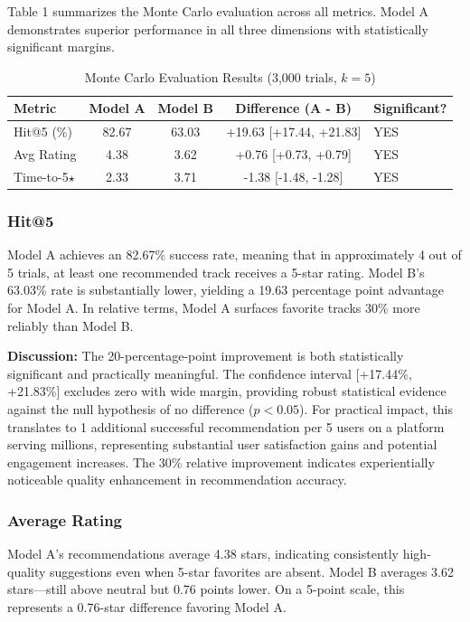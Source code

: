 \documentclass[12pt,a4paper]{article}
\begin{document}
Table 1 summarizes the Monte Carlo evaluation across all metrics. Model A demonstrates superior performance in all three dimensions with statistically significant margins.

\begin{table}[H]
\centering
\caption{Monte Carlo Evaluation Results (3,000 trials, $k=5$)}
\label{tab:mc_results}
\begin{tabular}{lcccl}
\toprule
\textbf{Metric} & \textbf{Model A} & \textbf{Model B} & \textbf{Difference (A - B)} & \textbf{Significant?} \\
\midrule
Hit@5 (\%) & 82.67 & 63.03 & +19.63 [+17.44, +21.83] & YES \\
Avg Rating & 4.38 & 3.62 & +0.76 [+0.73, +0.79] & YES \\
Time-to-5$\star$ & 2.33 & 3.71 & -1.38 [-1.48, -1.28] & YES \\
\bottomrule
\end{tabular}
\end{table}

\subsubsection{Hit@5}

Model A achieves an 82.67\% success rate, meaning that in approximately 4 out of 5 trials, at least one recommended track receives a 5-star rating. Model B's 63.03\% rate is substantially lower, yielding a 19.63 percentage point advantage for Model A. In relative terms, Model A surfaces favorite tracks 30\% more reliably than Model B.

\textbf{Discussion:} The 20-percentage-point improvement is both statistically significant and practically meaningful. The confidence interval [+17.44\%, +21.83\%] excludes zero with wide margin, providing robust statistical evidence against the null hypothesis of no difference ($p < 0.05$). For practical impact, this translates to 1 additional successful recommendation per 5 users on a platform serving millions, representing substantial user satisfaction gains and potential engagement increases. The 30\% relative improvement indicates experientially noticeable quality enhancement in recommendation accuracy.

\subsubsection{Average Rating}

Model A's recommendations average 4.38 stars, indicating consistently high-quality suggestions even when 5-star favorites are absent. Model B averages 3.62 stars—still above neutral but 0.76 points lower. On a 5-point scale, this represents a 0.76-star difference favoring Model A.
\end{document}
